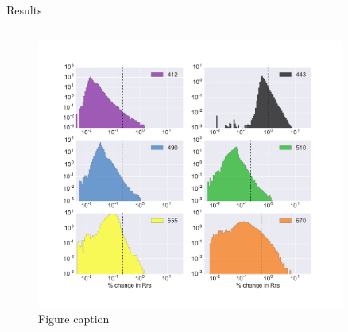 \documentclass[final]{beamer}
\newlength{\sepwid}
\newlength{\onecolwid}
\newlength{\twocolwid}
\begin{document}
\begin{frame}[t]
\begin{columns}[t]
\begin{column}{\onecolwid}





\end{column} %

\begin{column}{\sepwid}\end{column} %

\begin{column}{\twocolwid} %
\begin{block}{Results}

\begin{columns}[t,totalwidth=\twocolwid] %

\begin{column}{\onecolwid}\vspace{-.6in} %

\begin{figure}
\includegraphics[width=1.1\linewidth]{Propagation443.pdf}
\\{Figure caption}
\end{figure}



\end{column}
\end{columns}
\end{block}
\end{column}
\end{columns}
\end{frame}
\end{document}
